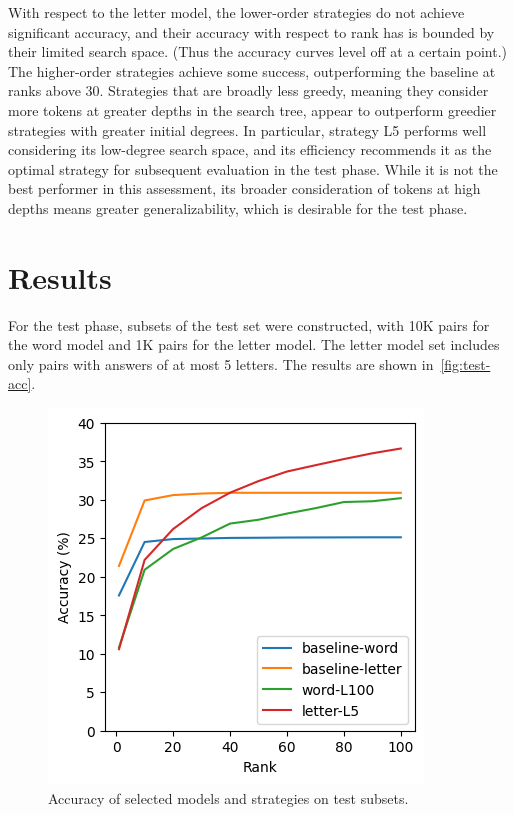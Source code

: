 \documentclass[letterpaper]{article} %
\begin{document}
\begin{NoHyper}
With respect to the letter model, the lower-order strategies do not achieve significant accuracy,
and their accuracy with respect to rank has is bounded by their limited search space.
(Thus the accuracy curves level off at a certain point.)
The higher-order strategies achieve some success, outperforming the baseline at ranks above 30.
Strategies that are broadly less greedy, meaning they consider more tokens at greater depths in the search tree, appear to outperform greedier strategies with greater initial degrees.
In particular, strategy L5 performs well considering its low-degree search space, and its efficiency recommends it as the optimal strategy for subsequent evaluation in the test phase.
While it is not the best performer in this assessment, its broader consideration of tokens at high depths means
greater generalizability, which is desirable for the test phase.

\section{Results}
\label{sec:results}

For the test phase, subsets of the test set were constructed, with 10K pairs
for the word model and 1K pairs for the letter model.
The letter model set includes only pairs with answers of at most 5 letters.
The results are shown in~\autoref{fig:test-acc}.

\begin{figure}
\centering
\includegraphics[width=0.75\columnwidth]{fig-test-acc}
\caption{Accuracy of selected models and strategies on test subsets.}
\label{fig:test-acc}
\end{figure}


\end{NoHyper}
\end{document}
